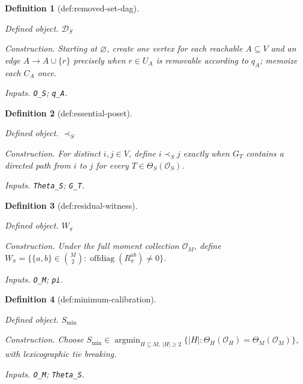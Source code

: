 \documentclass{article}
\newtheorem{definition}{Definition}
\begin{document}
\begin{definition}[def:removed-set-dag]\label{def:removed-set-dag}
\par\smallskip\noindent\emph{Defined object.} \(\mathcal D_S\)
\par\smallskip\noindent\emph{Construction.} Starting at \(\varnothing\), create one vertex for each reachable \(A\subseteq V\) and an edge \(A\to A\cup\{r\}\) precisely when \(r\in U_A\) is removable according to \(q_A\); memoize each \(C_A\) once.
\par\smallskip\noindent\emph{Inputs.} \texttt{O\_\allowbreak{}S}; \texttt{q\_\allowbreak{}A}.
\end{definition}

\begin{definition}[def:essential-poset]\label{def:essential-poset}
\par\smallskip\noindent\emph{Defined object.} \(\prec_S\)
\par\smallskip\noindent\emph{Construction.} For distinct \(i,j\in V\), define \(i\prec_S j\) exactly when \(G_T\) contains a directed path from \(i\) to \(j\) for every \(T\in\Theta_S(\mathcal O_S)\).
\par\smallskip\noindent\emph{Inputs.} \texttt{Theta\_\allowbreak{}S}; \texttt{G\_\allowbreak{}T}.
\end{definition}

\begin{definition}[def:residual-witness]\label{def:residual-witness}
\par\smallskip\noindent\emph{Defined object.} \(W_\pi\)
\par\smallskip\noindent\emph{Construction.} Under the full moment collection \(\mathcal O_M\), define \(W_\pi=\{\{a,b\}\in\binom M2:\operatorname{offdiag}(R_\pi^{ab})\ne0\}\).
\par\smallskip\noindent\emph{Inputs.} \texttt{O\_\allowbreak{}M}; \texttt{pi}.
\end{definition}

\begin{definition}[def:minimum-calibration]\label{def:minimum-calibration}
\par\smallskip\noindent\emph{Defined object.} \(S_{\min}\)
\par\smallskip\noindent\emph{Construction.} Choose \(S_{\min}\in\operatorname*{argmin}_{H\subseteq M,\,\lvert H\rvert\ge2}\{\lvert H\rvert:\Theta_H(\mathcal O_H)=\Theta_M(\mathcal O_M)\}\), with lexicographic tie breaking.
\par\smallskip\noindent\emph{Inputs.} \texttt{O\_\allowbreak{}M}; \texttt{Theta\_\allowbreak{}S}.
\end{definition}
\end{document}
